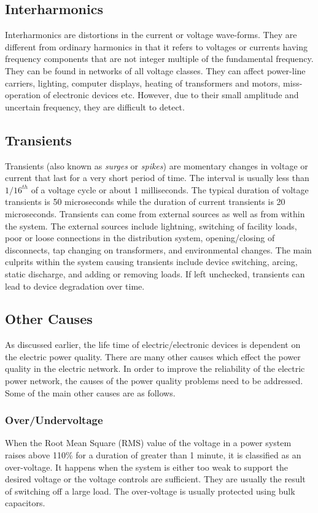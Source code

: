 \subsection{Interharmonics}
Interharmonics are distortions in the current or voltage wave-forms. They are different from ordinary harmonics in that it refers to voltages or currents having frequency components that are not integer multiple of the fundamental frequency. They can be found in networks of all voltage classes. They can affect power-line carriers, lighting, computer displays, heating of transformers and motors, miss-operation of electronic devices etc. However, due to their small amplitude and uncertain frequency, they are difficult to detect.

\subsection{Transients}
Transients (also known as \textit{surges} or \textit{spikes}) are momentary changes in voltage or current that last for a very short period of time. The interval is usually less than $1/16^{th}$ of a voltage cycle or about 1 milliseconds. The typical duration of voltage transients is 50 microseconds while the duration of current transients is 20 microseconds. Transients can come from external sources as well as from within the system. The external sources include lightning, switching of facility loads, poor or loose connections in the distribution system, opening/closing of disconnects, tap changing on transformers, and environmental changes. The main culprits within the system causing transients include device switching, arcing, static discharge, and adding or removing loads. If left unchecked, transients can lead to device degradation over time.

\subsection{Other Causes}
As discussed earlier, the life time of electric/electronic devices is dependent on the electric power quality. There are many other causes which effect the power quality in the electric network. In order to improve the reliability of the electric power network, the causes of the power quality problems need to be addressed. Some of the main other causes are as follows.

\subsubsection{Over/Undervoltage}
When the Root Mean Square (RMS) value of the voltage in a power system raises above 110\% for a duration of greater than 1 minute, it is classified as an over-voltage. It happens when the system is either too weak to support the desired voltage or the voltage controls are sufficient. They are usually the result of switching off a large load. The over-voltage is usually protected using bulk capacitors.

